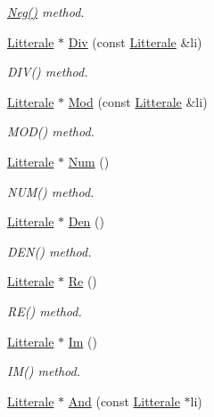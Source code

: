 \begin{DoxyCompactItemize}
\begin{DoxyCompactList}\small\item\em \hyperlink{class_li_entiere_a708a535d92593c881c749f70bbdfacde}{Neg()} method. \end{DoxyCompactList}\item 
\hyperlink{class_litterale}{Litterale} $\ast$ \hyperlink{class_li_entiere_ac8dff5087eff515905a3d20764ed4095}{Div} (const \hyperlink{class_litterale}{Litterale} \&li)
\begin{DoxyCompactList}\small\item\em D\+I\+V() method. \end{DoxyCompactList}\item 
\hyperlink{class_litterale}{Litterale} $\ast$ \hyperlink{class_li_entiere_a9e0d8652c27234c9671ea6146477fa92}{Mod} (const \hyperlink{class_litterale}{Litterale} \&li)
\begin{DoxyCompactList}\small\item\em M\+O\+D() method. \end{DoxyCompactList}\item 
\hyperlink{class_litterale}{Litterale} $\ast$ \hyperlink{class_li_entiere_a482e5cb35a25e22bd243490e7444bf96}{Num} ()
\begin{DoxyCompactList}\small\item\em N\+U\+M() method. \end{DoxyCompactList}\item 
\hyperlink{class_litterale}{Litterale} $\ast$ \hyperlink{class_li_entiere_ac8936753e6ecfe460e14966b81f0b7e6}{Den} ()
\begin{DoxyCompactList}\small\item\em D\+E\+N() method. \end{DoxyCompactList}\item 
\hyperlink{class_litterale}{Litterale} $\ast$ \hyperlink{class_li_entiere_a6751154aae61b70ef2330a1e9155ed1a}{Re} ()
\begin{DoxyCompactList}\small\item\em R\+E() method. \end{DoxyCompactList}\item 
\hyperlink{class_litterale}{Litterale} $\ast$ \hyperlink{class_li_entiere_a11df7bad558ba4a282c9b5331abad07f}{Im} ()
\begin{DoxyCompactList}\small\item\em I\+M() method. \end{DoxyCompactList}\item 
\hyperlink{class_litterale}{Litterale} $\ast$ \hyperlink{class_li_entiere_acda292c445dfc7175a8c3112a2f626b6}{And} (const \hyperlink{class_litterale}{Litterale} $\ast$li)

\end{DoxyCompactItemize}
